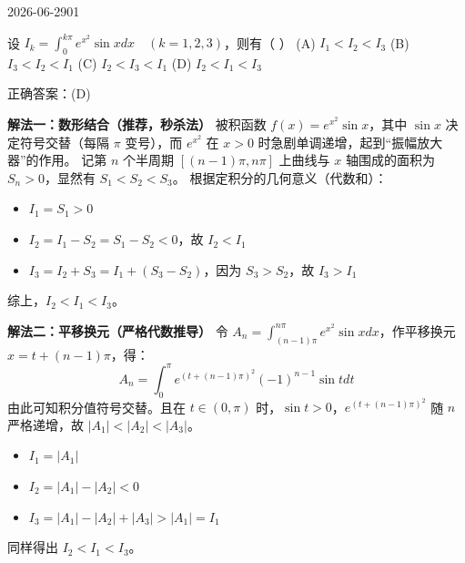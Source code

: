 \begin{mistake}{2026-06-29}{01}

\begin{problemcontent}
设 \( I_k = \int_0^{k\pi} e^{x^2} \sin x dx \quad (k = 1, 2, 3) \)，则有（ \quad ）
(A) \( I_1 < I_2 < I_3 \)
(B) \( I_3 < I_2 < I_1 \)
(C) \( I_2 < I_3 < I_1 \)
(D) \( I_2 < I_1 < I_3 \)
\end{problemcontent}

\begin{solutioncontent}
正确答案：(D)

\textbf{解法一：数形结合（推荐，秒杀法）}
被积函数 \( f(x) = e^{x^2} \sin x \)，其中 \( \sin x \) 决定符号交替（每隔 \( \pi \) 变号），而 \( e^{x^2} \) 在 \( x > 0 \) 时急剧单调递增，起到“振幅放大器”的作用。
记第 \( n \) 个半周期 \( [(n-1)\pi, n\pi] \) 上曲线与 \( x \) 轴围成的面积为 \( S_n > 0 \)，显然有 \( S_1 < S_2 < S_3 \)。
根据定积分的几何意义（代数和）：
\begin{itemize}
    \item \( I_1 = S_1 > 0 \)
    \item \( I_2 = I_1 - S_2 = S_1 - S_2 < 0 \)，故 \( I_2 < I_1 \)
    \item \( I_3 = I_2 + S_3 = I_1 + (S_3 - S_2) \)，因为 \( S_3 > S_2 \)，故 \( I_3 > I_1 \)
\end{itemize}
综上，\( I_2 < I_1 < I_3 \)。

\textbf{解法二：平移换元（严格代数推导）}
令 \( A_n = \int_{(n-1)\pi}^{n\pi} e^{x^2} \sin x dx \)，作平移换元 \( x = t + (n-1)\pi \)，得：
\[ A_n = \int_0^{\pi} e^{(t + (n-1)\pi)^2} (-1)^{n-1} \sin t dt \]
由此可知积分值符号交替。且在 \( t \in (0, \pi) \) 时，\( \sin t > 0 \)，\( e^{(t + (n-1)\pi)^2} \) 随 \( n \) 严格递增，故 \( |A_1| < |A_2| < |A_3| \)。
\begin{itemize}
    \item \( I_1 = |A_1| \)
    \item \( I_2 = |A_1| - |A_2| < 0 \)
    \item \( I_3 = |A_1| - |A_2| + |A_3| > |A_1| = I_1 \)
\end{itemize}
同样得出 \( I_2 < I_1 < I_3 \)。
\end{solutioncontent}


\end{mistake}
